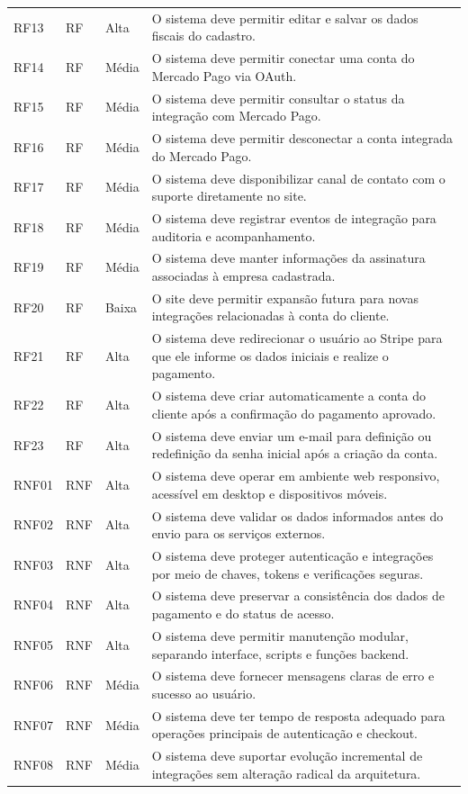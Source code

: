 \documentclass[
  12pt,
  openany,
  oneside,
  a4paper,
  brazil
]{abntex2}
\begin{document}
\begin{longtable}{>{\raggedright\arraybackslash}p{1.8cm} >{\raggedright\arraybackslash}p{1.8cm} >{\raggedright\arraybackslash}p{2cm} >{\raggedright\arraybackslash}p{8.8cm}}
RF13 & RF & Alta & O sistema deve permitir editar e salvar os dados fiscais do cadastro. \\
RF14 & RF & M\'edia & O sistema deve permitir conectar uma conta do Mercado Pago via OAuth. \\
RF15 & RF & M\'edia & O sistema deve permitir consultar o status da integra\c{c}\~ao com Mercado Pago. \\
RF16 & RF & M\'edia & O sistema deve permitir desconectar a conta integrada do Mercado Pago. \\
RF17 & RF & M\'edia & O sistema deve disponibilizar canal de contato com o suporte diretamente no site. \\
RF18 & RF & M\'edia & O sistema deve registrar eventos de integra\c{c}\~ao para auditoria e acompanhamento. \\
RF19 & RF & M\'edia & O sistema deve manter informa\c{c}\~oes da assinatura associadas \`a empresa cadastrada. \\
RF20 & RF & Baixa & O site deve permitir expans\~ao futura para novas integra\c{c}\~oes relacionadas \`a conta do cliente. \\
RF21 & RF & Alta & O sistema deve redirecionar o usu\'ario ao Stripe para que ele informe os dados iniciais e realize o pagamento. \\
RF22 & RF & Alta & O sistema deve criar automaticamente a conta do cliente ap\'os a confirma\c{c}\~ao do pagamento aprovado. \\
RF23 & RF & Alta & O sistema deve enviar um e-mail para defini\c{c}\~ao ou redefini\c{c}\~ao da senha inicial ap\'os a cria\c{c}\~ao da conta. \\
RNF01 & RNF & Alta & O sistema deve operar em ambiente web responsivo, acess\'ivel em desktop e dispositivos m\'oveis. \\
RNF02 & RNF & Alta & O sistema deve validar os dados informados antes do envio para os servi\c{c}os externos. \\
RNF03 & RNF & Alta & O sistema deve proteger autentica\c{c}\~ao e integra\c{c}\~oes por meio de chaves, tokens e verifica\c{c}\~oes seguras. \\
RNF04 & RNF & Alta & O sistema deve preservar a consist\^encia dos dados de pagamento e do status de acesso. \\
RNF05 & RNF & Alta & O sistema deve permitir manuten\c{c}\~ao modular, separando interface, scripts e fun\c{c}\~oes backend. \\
RNF06 & RNF & M\'edia & O sistema deve fornecer mensagens claras de erro e sucesso ao usu\'ario. \\
RNF07 & RNF & M\'edia & O sistema deve ter tempo de resposta adequado para opera\c{c}\~oes principais de autentica\c{c}\~ao e checkout. \\
RNF08 & RNF & M\'edia & O sistema deve suportar evolu\c{c}\~ao incremental de integra\c{c}\~oes sem altera\c{c}\~ao radical da arquitetura. \\
\bottomrule
\end{longtable}
\end{document}
